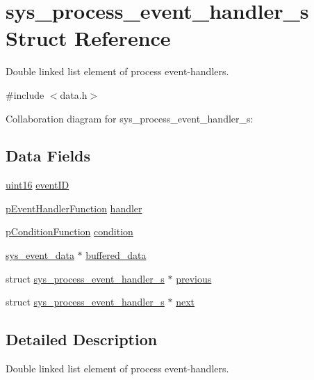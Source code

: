 \hypertarget{structsys__process__event__handler__s}{}\section{sys\+\_\+process\+\_\+event\+\_\+handler\+\_\+s Struct Reference}
\label{structsys__process__event__handler__s}


Double linked list element of process event-\/handlers.  




{\ttfamily \#include $<$data.\+h$>$}



Collaboration diagram for sys\+\_\+process\+\_\+event\+\_\+handler\+\_\+s\+:
\subsection*{Data Fields}
\begin{DoxyCompactItemize}
\item 
\hyperlink{definitions_8h_a05f6b0ae8f6a6e135b0e290c25fe0e4e}{uint16} \hyperlink{structsys__process__event__handler__s_a4b799aaf40561daed132a1a1d688ecd8}{event\+I\+D}
\item 
\hyperlink{events_8h_a38c799788eea576b2d878371da3d5385}{p\+Event\+Handler\+Function} \hyperlink{structsys__process__event__handler__s_a980eeb4cb54ac72cd3ebc38e391c40a5}{handler}
\item 
\hyperlink{events_8h_a653a4a4b7d9f5a65e1415365267a9d9e}{p\+Condition\+Function} \hyperlink{structsys__process__event__handler__s_a43ea89783cb8b5cfd0896410f1f7a691}{condition}
\item 
\hyperlink{events_8h_ae3a76ca1b349999a35d55f3224897b5f}{sys\+\_\+event\+\_\+data} $\ast$ \hyperlink{structsys__process__event__handler__s_adbcb330724f201fb328fb91d2c6353e3}{buffered\+\_\+data}
\item 
struct \hyperlink{structsys__process__event__handler__s}{sys\+\_\+process\+\_\+event\+\_\+handler\+\_\+s} $\ast$ \hyperlink{structsys__process__event__handler__s_abbb4742265dace5feffc2a1b05d5271c}{previous}
\item 
struct \hyperlink{structsys__process__event__handler__s}{sys\+\_\+process\+\_\+event\+\_\+handler\+\_\+s} $\ast$ \hyperlink{structsys__process__event__handler__s_abd718f866343f0a1e139c977bbae72b8}{next}
\end{DoxyCompactItemize}


\subsection{Detailed Description}
Double linked list element of process event-\/handlers. 

